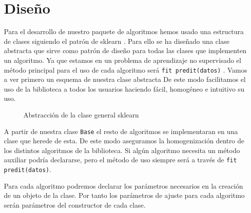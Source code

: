 \chapter{Diseño}
Para el desarrollo de nuestro paquete de algoritmos hemos usado una
estructura de clases siguiendo el patrón de sklearn \cite{APIReferenceScikitlearn}.
Para ello se ha diseñado una clase abstracta que sirve como patrón 
de diseño para todas las clases que implementen un algoritmo.
Ya que estamos en un problema de aprendizaje no supervisado el método
principal para el uso de cada algoritmo será \texttt{fit predit(datos)} .
Vamos a ver primero un esquema de nuestra clase abstracta
De este modo facilitamos el uso de la biblioteca a todos los usuarios
haciendo fácil, homogéneo e intuitivo su uso.
 
\begin{figure}[h]
    \caption{\label{fig:base-abstraccion} Abstracción de la clase general sklearn}
\end{figure}

A partir de nuestra clase \texttt{Base} el resto de algoritmos se
implementaran en una clase que herede de esta. De este modo aseguramos
la homogenización dentro de los distintos algoritmos de la biblioteca.
Si algún algoritmo necesita un método auxiliar podría declararse, pero el 
método de uso siempre será a través de \texttt{fit predit(datos)}.

Para cada algoritmo podremos declarar 
los parámetros necesarios en la creación de un objeto de la clase. Por 
tanto los parámetros de ajuste para cada algoritmo serán parámetros del 
constructor de cada clase.

